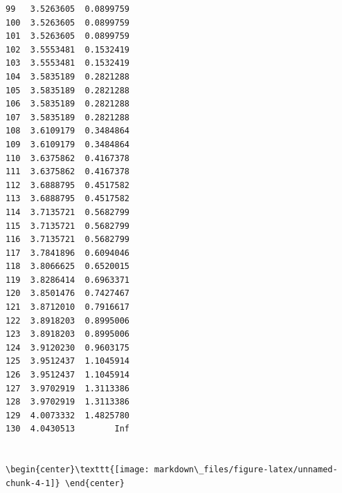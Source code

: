 \documentclass[
]{article}
\begin{document}
\begin{verbatim}
99   3.5263605  0.0899759
100  3.5263605  0.0899759
101  3.5263605  0.0899759
102  3.5553481  0.1532419
103  3.5553481  0.1532419
104  3.5835189  0.2821288
105  3.5835189  0.2821288
106  3.5835189  0.2821288
107  3.5835189  0.2821288
108  3.6109179  0.3484864
109  3.6109179  0.3484864
110  3.6375862  0.4167378
111  3.6375862  0.4167378
112  3.6888795  0.4517582
113  3.6888795  0.4517582
114  3.7135721  0.5682799
115  3.7135721  0.5682799
116  3.7135721  0.5682799
117  3.7841896  0.6094046
118  3.8066625  0.6520015
119  3.8286414  0.6963371
120  3.8501476  0.7427467
121  3.8712010  0.7916617
122  3.8918203  0.8995006
123  3.8918203  0.8995006
124  3.9120230  0.9603175
125  3.9512437  1.1045914
126  3.9512437  1.1045914
127  3.9702919  1.3113386
128  3.9702919  1.3113386
129  4.0073332  1.4825780
130  4.0430513        Inf


\begin{center}\texttt{[image: markdown\_files/figure-latex/unnamed-chunk-4-1]} \end{center}


\end{verbatim}
\end{document}
